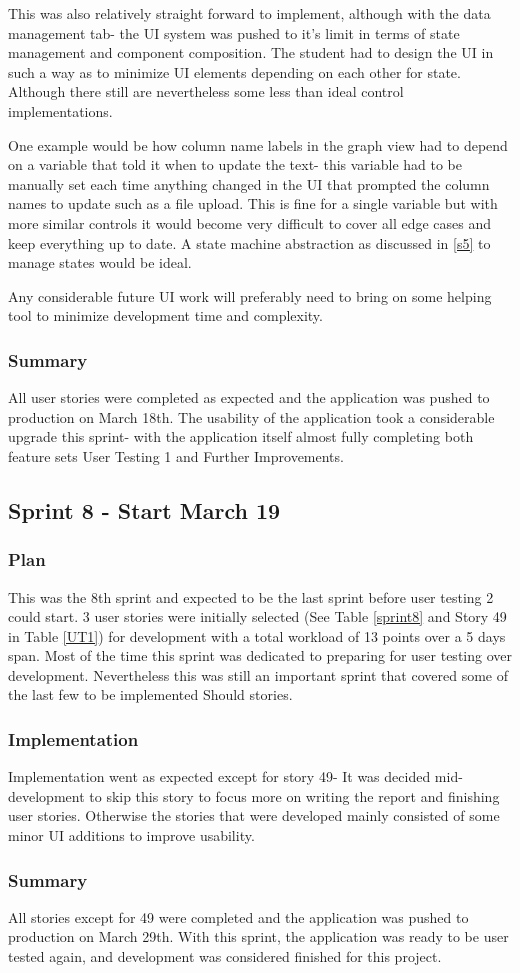 This was also relatively straight forward to implement, although with the data management tab- the UI system was pushed to it's limit in terms of state management and component composition. The student had to design the UI in such a way as to minimize UI elements depending on each other for state. Although there still are nevertheless some less than ideal control implementations.

One example would be how column name labels in the graph view had to depend on a variable that told it when to update the text- this variable had to be manually set each time anything changed in the UI that prompted the column names to update such as a file upload. This is fine for a single variable but with more similar controls it would become very difficult to cover all edge cases and keep everything up to date. A state machine abstraction as discussed in \ref{s5} to manage states would be ideal.

Any considerable future UI work will preferably need to bring on some helping tool to minimize development time and complexity.

\subsubsection{Summary}
All user stories were completed as expected and the application was pushed to production on March 18th. The usability of the application took a considerable upgrade this sprint- with the application itself almost fully completing both feature sets User Testing 1 and Further Improvements.

\subsection{Sprint 8 - Start March 19}
\subsubsection{Plan}
This was the 8th sprint and expected to be the last sprint before user testing 2 could start. 3 user stories were initially selected (See Table \ref{sprint8} and Story 49 in Table \ref{UT1}) for development with a total workload of 13 points over a 5 days span. Most of the time this sprint was dedicated to preparing for user testing over development. Nevertheless this was still an important sprint that covered some of the last few to be implemented Should stories.

\subsubsection{Implementation}
Implementation went as expected except for story 49- It was decided mid-development to skip this story to focus more on writing the report and finishing user stories. Otherwise the stories that were developed mainly consisted of some minor UI additions to improve usability.

\subsubsection{Summary}
All stories except for 49 were completed and the application was pushed to production on March 29th. With this sprint, the application was ready to be user tested again, and development was considered finished for this project.

